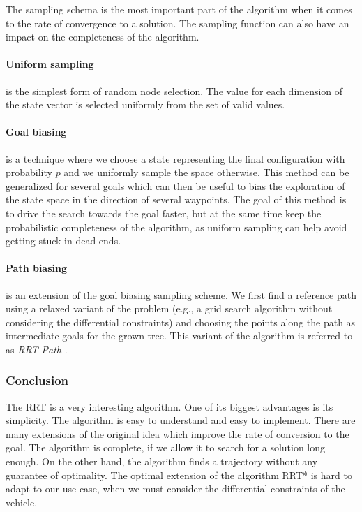 The sampling schema is the most important part of the algorithm when it comes to the rate of convergence to a solution. The sampling function can also have an impact on the completeness of the algorithm.

\paragraph{Uniform sampling} is the simplest form of random node selection. The value for each dimension of the state vector is selected uniformly from the set of valid values.

\paragraph{Goal biasing} is a technique where we choose a state representing the final configuration with probability $p$ and we uniformly sample the space otherwise. This method can be generalized for several goals which can then be useful to bias the exploration of the state space in the direction of several waypoints. The goal of this method is to drive the search towards the goal faster, but at the same time keep the probabilistic completeness of the algorithm, as uniform sampling can help avoid getting stuck in dead ends.

\paragraph{Path biasing} is an extension of the goal biasing sampling scheme. We first find a reference path using a relaxed variant of the problem (e.g., a grid search algorithm without considering the differential constraints) and choosing the points along the path as intermediate goals for the grown tree. This variant of the algorithm is referred to as \textit{RRT-Path} \cite{RRT_guiding_path}.

\subsubsection{Conclusion}

The \gls*{RRT} is a very interesting algorithm. One of its biggest advantages is its simplicity. The algorithm is easy to understand and easy to implement. There are many extensions of the original idea which improve the rate of conversion to the goal. The algorithm is complete, if we allow it to search for a solution long enough. On the other hand, the algorithm finds a trajectory without any guarantee of optimality. The optimal extension of the algorithm \gls{RRT*} is hard to adapt to our use case, when we must consider the differential constraints of the vehicle.

